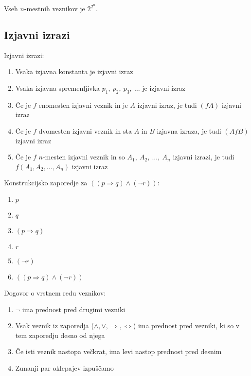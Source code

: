 \documentclass[12pt, a4paper]{article}
\renewcommand{\implies}{\Rightarrow}
\renewcommand{\iff}{\Leftrightarrow}
\begin{document}
Vseh $n$-mestnih veznikov je $2^{2^n}$.

\newpage

\subsection{Izjavni izrazi}

\begin{okvir}
\begin{definicija}
Izjavni izrazi:

\begin{enumerate}[label=(\roman*)]
\item Vsaka izjavna konstanta je izjavni izraz
\item Vsaka izjavna spremenljivka $p_1,~p_2,~p_3,~\dots$ je izjavni izraz
\item Če je $f$ enomesten izjavni veznik in je $A$ izjavni izraz, je tudi $(fA)$ izjavni izraz
\item Če je $f$ dvomesten izjavni veznik in sta $A$ in $B$ izjavna izraza, je tudi $(AfB)$ izjavni izraz
\item Če je $f$ $n$-mesten izjavni veznik in so $A_1,~A_2,~\dots,~A_n$ izjavni izrazi, je tudi $f(A_1, A_2, \dots, A_n)$ izjavni izraz
\end{enumerate}
\end{definicija}
\end{okvir}

\begin{zgled}
Konstrukcijsko zaporedje za $((p\implies q)\land(\neg r))$:

\begin{multicols}{3}
\begin{enumerate}
\item $p$
\item $q$
\item $(p\implies q)$
\item $r$
\item $(\neg r)$
\item $((p\implies q)\land(\neg r))$
\end{enumerate}
\end{multicols}
\end{zgled}

\begin{definicija}
Dogovor o vrstnem redu veznikov:

\begin{enumerate}
\item $\neg$ ima prednost pred drugimi vezniki
\item Vsak veznik iz zaporedja ($\land,\lor,\implies,\iff$) ima prednost pred vezniki, ki so v tem zaporedju desno od njega
\item Če isti veznik nastopa večkrat, ima levi nastop prednost pred desnim
\item Zunanji par oklepajev izpuščamo
\end{enumerate}
\end{definicija}
\end{document}
